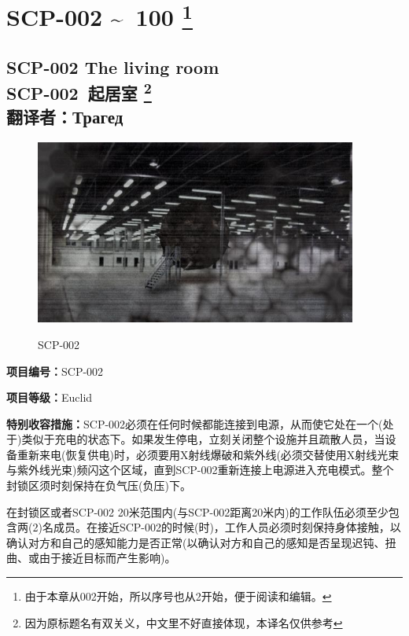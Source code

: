\documentclass[openany,a4paper]{book} %
\newcounter{mychapter} %
\begin{document}
\part[SCP-002 \textasciitilde\ 100]{SCP-002 \textasciitilde\ 100 \protect\footnote{由于本章从002开始，所以序号也从2开始，便于阅读和编辑。}}
\setcounter{mychapter}{2}
\chapter[SCP-002 起居室]{SCP-002 The living room \\ SCP-002\ 起居室 \protect\footnote{因为原标题名有双关义，中文里不好直接体现，本译名仅供参考} \\ 翻译者：Трагед}\label{chap:SCP-002}
\begin{figure}[H]
  \centering
  \includegraphics[width=300pt]{Pic/SCP-002.jpg}\\
  \caption{SCP-002}\label{fig:SCP-002}
\end{figure}

\textbf{项目编号：}SCP-002\vspace{12pt}

\textbf{项目等级：}Euclid\vspace{12pt}

\textbf{特别收容措施：}SCP-002必须在任何时候都能连接到电源，从而使它处在一个(处于)类似于充电的状态下。如果发生停电，立刻关闭整个设施并且疏散人员，当设备重新来电(恢复供电)时，必须要用X射线爆破和紫外线(必须交替使用X射线光束与紫外线光束)频闪这个区域，直到SCP-002重新连接上电源进入充电模式。整个封锁区须时刻保持在负气压(负压)下。\vspace{12pt}

在封锁区或者SCP-002 20米范围内(与SCP-002距离20米内)的工作队伍必须至少包含两(2)名成员。在接近SCP-002的时候(时)，工作人员必须时刻保持身体接触，以确认对方和自己的感知能力是否正常(以确认对方和自己的感知是否呈现迟钝、扭曲、或由于接近目标而产生影响)。\vspace{12pt}
\end{document}
